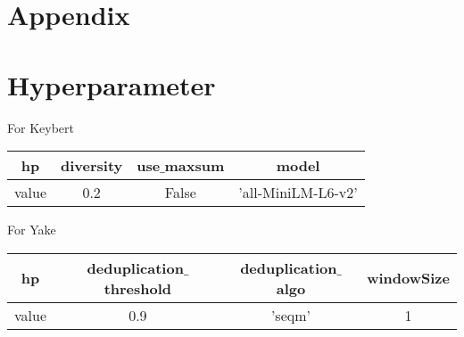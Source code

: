 \documentclass[11pt,a4paper]{article}
\begin{document}
\section{Appendix}
\appendix
\section{Hyperparameter}
For Keybert
\begin{center}
    \begin{tabular}{cccc}
        \hline
        hp& diversity&use$\_$maxsum & model\\
        \hline
        value& 0.2& False& 'all-MiniLM-L6-v2' \\
        \hline
    \end{tabular}
\end{center}
\noindent
For Yake
\begin{center}
    \begin{tabular}{cccc}
        \hline
        hp& deduplication$\_$threshold& deduplication$\_$algo& windowSize\\
        \hline
        value&  0.9& 'seqm'& 1 \\
        \hline
    \end{tabular}
\end{center}


\end{document}
